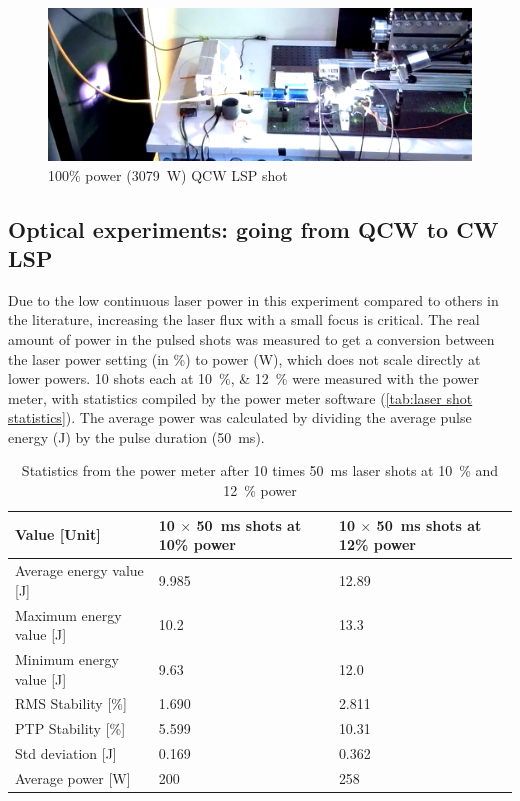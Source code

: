             \begin{figure}[!ht]
                \centering
                \includegraphics[width=\textwidth]{assets/4 experiments/holy jesus look at this.png}
                \caption{100\% power (\qty{3079}{W}) QCW LSP shot}
                \label{fig: big flash}
            \end{figure}

        \subsection{Optical experiments: going from QCW to CW LSP}

            Due to the low continuous laser power in this experiment compared to others in the literature, increasing the laser flux with a small focus is critical. The real amount of power in the pulsed shots was measured to get a conversion between the laser power setting (in \%) to power (W), which does not scale directly at lower powers. 10 shots each at \qtylist{10; 12}{\%} were measured with the power meter, with statistics compiled by the power meter software (\autoref{tab:laser shot statistics}). The average power was calculated by dividing the average pulse energy (J) by the pulse duration (\qty{50}{ms}).

            \begin{table}[!ht]
                \caption{Statistics from the power meter after 10 times \qty{50}{ms} laser shots at \qty{10}{\%} and \qty{12}{\%} power}
                \label{tab:laser shot statistics}
                \begin{tabular}{lll}
                \textbf{Value {[}Unit{]}} & \textbf{10 $\times$ \qty{50}{ms} shots at 10\% power} & \textbf{10 $\times$ \qty{50}{ms} shots at 12\% power} \\ \hline
                Average energy value {[}J{]}  & 9.985 & 12.89 \\
                Maximum energy value {[}J{]}  & 10.2  & 13.3  \\
                Minimum energy value {[}J{]}  & 9.63  & 12.0  \\
                RMS Stability {[}\%{]} & 1.690 & 2.811 \\
                PTP Stability {[}\%{]} & 5.599 & 10.31 \\
                Std deviation {[}J{]}  & 0.169 & 0.362 \\
                Average power {[}W{]}  & 200 & 258  \\ \hline
                \end{tabular}
            \end{table}
            
